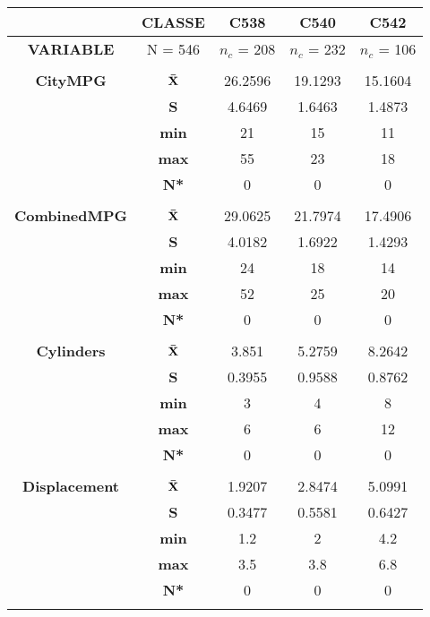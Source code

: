 \newpage

\begin{center}
\begin{tabular}{|c|c||c|c|c|}
\hline
 & {\bf CLASSE } & {\bf C538} & {\bf C540} & {\bf C542}\\
\hline
{\bf VARIABLE} & N = 546 & $n_c$ = 208 & $n_c$ = 232 & $n_c$ = 106\\
\hline
\hline
 &  &  &  & \\  [-2.4ex]
{\bf CityMPG} &  $\bf \bar{X}$ & 26.2596 & 19.1293 & 15.1604 \\
\cline{2-5}
 & {\bf  S} & 4.6469 & 1.6463 & 1.4873 \\
\cline{2-5}
 & {\bf  min} & 21 & 15 & 11 \\
\cline{2-5}
 & {\bf  max} & 55 & 23 & 18 \\
\cline{2-5}
 & {\bf  N*} & 0 & 0 & 0 \\
\cline{2-5}
\hline
\hline
 &  &  &  & \\  [-2.4ex]
{\bf CombinedMPG} &  $\bf \bar{X}$ & 29.0625 & 21.7974 & 17.4906 \\
\cline{2-5}
 & {\bf  S} & 4.0182 & 1.6922 & 1.4293 \\
\cline{2-5}
 & {\bf  min} & 24 & 18 & 14 \\
\cline{2-5}
 & {\bf  max} & 52 & 25 & 20 \\
\cline{2-5}
 & {\bf  N*} & 0 & 0 & 0 \\
\cline{2-5}
\hline
\hline
 &  &  &  & \\  [-2.4ex]
{\bf Cylinders} &  $\bf \bar{X}$ & 3.851 & 5.2759 & 8.2642 \\
\cline{2-5}
 & {\bf  S} & 0.3955 & 0.9588 & 0.8762 \\
\cline{2-5}
 & {\bf  min} & 3 & 4 & 8 \\
\cline{2-5}
 & {\bf  max} & 6 & 6 & 12 \\
\cline{2-5}
 & {\bf  N*} & 0 & 0 & 0 \\
\cline{2-5}
\hline
\hline
 &  &  &  & \\  [-2.4ex]
{\bf Displacement} &  $\bf \bar{X}$ & 1.9207 & 2.8474 & 5.0991 \\
\cline{2-5}
 & {\bf  S} & 0.3477 & 0.5581 & 0.6427 \\
\cline{2-5}
 & {\bf  min} & 1.2 & 2 & 4.2 \\
\cline{2-5}
 & {\bf  max} & 3.5 & 3.8 & 6.8 \\
\cline{2-5}
 & {\bf  N*} & 0 & 0 & 0 \\
\cline{2-5}
\hline
\hline
 &  &  &  & \\  [-2.4ex]

\end{tabular}
\end{center}
